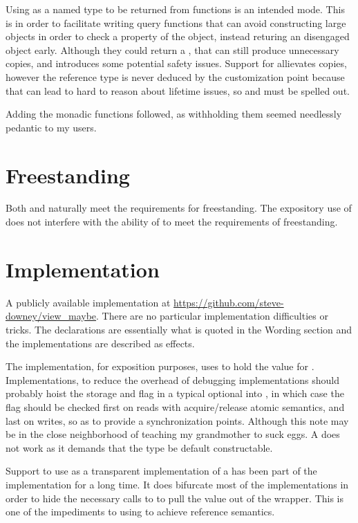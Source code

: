 \documentclass[a4paper,10pt,oneside,openany,final,article]{memoir}
\begin{document}
Using  as a named type to be returned from functions is an intended mode. This is in order to facilitate writing query functions that can avoid constructing large objects in order to check a property of the object, instead returing an disengaged object early. Although they could return a , that can still produce unnecessary copies, and introduces some potential safety issues. Support for  allievates copies, however the reference type is never deduced by the customization point because that can lead to hard to reason about lifetime issues, so  and  must be spelled out.

Adding the monadic functions followed, as withholding them seemed needlessly pedantic to my users.

\chapter{Freestanding}


Both  and  naturally meet the requirements for freestanding. The expository use of  does not interfere with the ability of  to meet the requirements of freestanding.


\chapter{Implementation}


A publicly available implementation at \url{https://github.com/steve-downey/view_maybe}. There are no particular implementation difficulties or tricks. The declarations are essentially what is quoted in the Wording section and the implementations are described as effects.

The implementation, for exposition purposes, uses  to hold the value for . Implementations, to reduce the overhead of debugging implementations should probably hoist the storage and flag in a typical optional into , in which case the flag should be checked first on reads with acquire/release atomic semantics, and last on writes, so as to provide a synchronization points. Although this note may be in the close neighborhood of teaching my grandmother to suck eggs. A  does not work as it demands that the type be default constructable.

Support to use  as a transparent implementation of a  has been part of the implementation for a long time. It does bifurcate most of the implementations in order to hide the necessary calls to  to pull the value out of the wrapper. This is one of the impediments to using  to achieve reference semantics.
\end{document}
